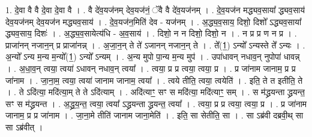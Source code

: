 \documentclass[17pt]{extarticle}
\begin{document}
1. दे॒वा वै वै दे॒वा दे॒वा वै । . वै दे॑व॒यज॑नम् देव॒यज॑नं॒ ॅवै वै दे॑व॒यज॑नम् । . दे॒व॒यज॑न मद्ध्यव॒साया᳚ द्ध्यव॒साय॑ देव॒यज॑नम् देव॒यज॑न मद्ध्यव॒साय॑ । . दे॒व॒यज॑न॒मिति॑ देव - यज॑नम् । . अ॒द्ध्य॒व॒साय॒ दिशो॒ दिशो᳚ ऽद्ध्यव॒साया᳚ द्ध्यव॒साय॒ दिशः॑ । . अ॒द्ध्य॒व॒सायेत्य॑धि - अ॒व॒साय॑ । . दिशो॒ न न दिशो॒ दिशो॒ न । . न प्र प्र ण न प्र । . प्राजा॑नन् नजान॒न् प्र प्राजा॑नन्न् । . अ॒जा॒न॒न् ते ते॑ ऽजानन् नजान॒न् ते । . ते᳚(1॒) ऽन्यो᳚ ऽन्यस्ते ते᳚ ऽन्यः । . अ॒न्यो᳚ ऽन्य म॒न्य म॒न्यो᳚(1॒) ऽन्यो᳚ ऽन्यम् । . अ॒न्य मुपो पा॒न्य म॒न्य मुप॑ । . उपा॑धावन् नधाव॒न् नुपोपा॑ धावन्न् । . अ॒धा॒व॒न् त्वया॒ त्वया॑ ऽधावन् नधाव॒न् त्वया᳚ । . त्वया॒ प्र प्र त्वया॒ त्वया॒ प्र । . प्र जा॑नाम जानाम॒ प्र प्र जा॑नाम । . जा॒ना॒म॒ त्वया॒ त्वया॑ जानाम जानाम॒ त्वया᳚ । . त्वये तीति॒ त्वया॒ त्वयेति॑ । . इति॒ ते त इतीति॒ ते । . ते ऽदि॑त्या॒ मदि॑त्या॒म् ते ते ऽदि॑त्याम् । . अदि॑त्याꣳ॒॒ सꣳ स मदि॑त्या॒ मदि॑त्याꣳ॒॒ सम् । . स म॑द्ध्रयन्ता द्ध्रयन्त॒ सꣳ स म॑द्ध्रयन्त । . अ॒द्ध्र॒य॒न्त॒ त्वया॒ त्वया᳚ ऽद्ध्रयन्ता द्ध्रयन्त॒ त्वया᳚ । . त्वया॒ प्र प्र त्वया॒ त्वया॒ प्र । . प्र जा॑नाम जानाम॒ प्र प्र जा॑नाम । . जा॒ना॒मे तीति॑ जानाम जाना॒मेति॑ । . इति॒ सा सेतीति॒ सा । . सा ऽब्र॑वी दब्रवी॒थ् सा सा ऽब्र॑वीत् । \newline
\end{document}
